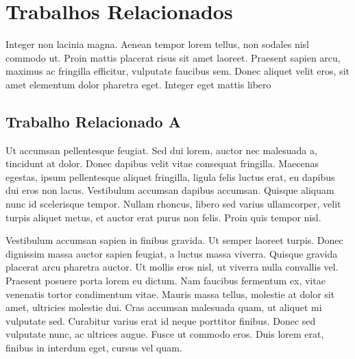 \chapter{Trabalhos Relacionados}
\label{cap:trabalhos-relacionados}

Integer non lacinia magna. Aenean tempor lorem tellus, non sodales nisl commodo ut. Proin mattis placerat risus sit amet laoreet. Praesent sapien arcu, maximus ac fringilla efficitur, vulputate faucibus sem. Donec aliquet velit eros, sit amet elementum dolor pharetra eget. Integer eget mattis libero

\section{Trabalho Relacionado A}
\label{sec:trabalho-relacionado-a}

Ut accumsan pellentesque feugiat. Sed dui lorem, auctor nec malesuada a, tincidunt at dolor. Donec dapibus velit vitae consequat fringilla. Maecenas egestas, ipsum pellentesque aliquet fringilla, ligula felis luctus erat, eu dapibus dui eros non lacus. Vestibulum accumsan dapibus accumsan. Quisque aliquam nunc id scelerisque tempor. Nullam rhoncus, libero sed varius ullamcorper, velit turpis aliquet metus, et auctor erat purus non felis. Proin quis tempor nisl.

	\begin{figure}[ht!]
		\centering
	\end{figure}
	
Vestibulum accumsan sapien in finibus gravida. Ut semper laoreet turpis. Donec dignissim massa auctor sapien feugiat, a luctus massa viverra. Quisque gravida placerat arcu pharetra auctor. Ut mollis eros nisl, ut viverra nulla convallis vel. Praesent posuere porta lorem eu dictum. Nam faucibus fermentum ex, vitae venenatis tortor condimentum vitae. Mauris massa tellus, molestie at dolor sit amet, ultricies molestie dui. Cras accumsan malesuada quam, ut aliquet mi vulputate sed. Curabitur varius erat id neque porttitor finibus. Donec sed vulputate nunc, ac ultrices augue. Fusce ut commodo eros. Duis lorem erat, finibus in interdum eget, cursus vel quam.

